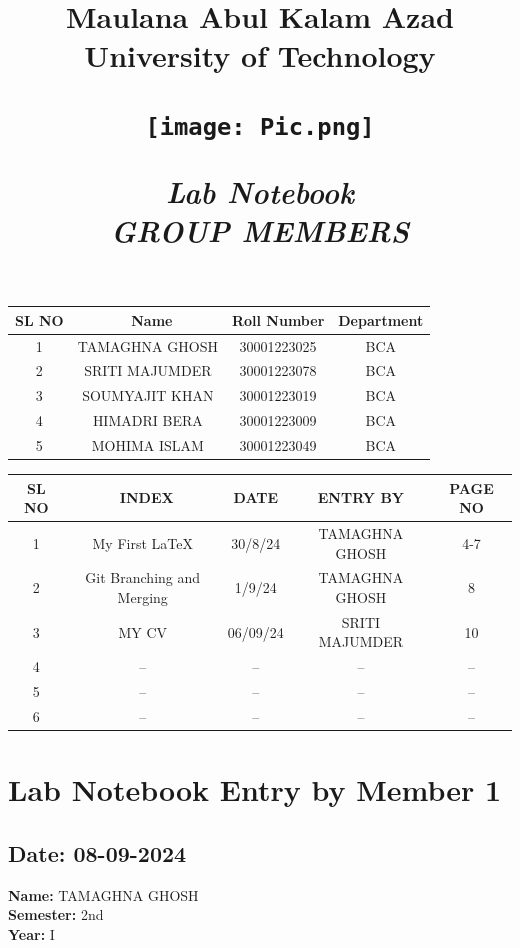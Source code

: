 \documentclass[12pt]{article}
\title{
    \vspace{0.2in}
    \Huge \textbf{Maulana Abul Kalam Azad University of Technology} \\
    \vspace{0.5in} %
    \begin{center}
        \texttt{[image: Pic.png]} %
    \end{center}
    \vspace{0.5in}
    \Huge\textbf{\textit{Lab Notebook}} \\
    \vspace{0.5in}
    \newpage
    \Large \textbf{\textit{GROUP MEMBERS}} \\
    \vspace{0.5in}
}
\date{}
\begin{document}
\maketitle

\begin{center}
    \begin{tabular}{|c| c | c | c |}
    \hline
    \textbf{SL NO}&\
    \textbf{Name} & \textbf{Roll Number} & \textbf{Department} \\
    \hline
     1 & TAMAGHNA GHOSH &30001223025 & BCA  \\
    \hline
     2& SRITI MAJUMDER & 30001223078 & BCA \\
    \hline
     3& SOUMYAJIT KHAN & 30001223019 & BCA   \\
    \hline
     4 & HIMADRI BERA & 30001223009 & BCA \\
    \hline
     5 & MOHIMA ISLAM & 30001223049 & BCA \\
    \hline
    \end{tabular}
\end{center}
\newpage
\begin{center}
    \begin{tabular}{|c|  c | c|c|c| }
    \hline
    \textbf{SL NO}&\
    \textbf{INDEX} & \textbf{DATE}&\textbf{ENTRY BY} &\textbf{PAGE NO} \\
    \hline
     1 & My First \LaTeX & 30/8/24&TAMAGHNA GHOSH & 4-7\\
    \hline
     2&Git Branching and Merging&1/9/24& TAMAGHNA GHOSH &8 \\
    \hline
     3&  MY CV & 06/09/24 & SRITI MAJUMDER & 10\\
    \hline
    4&   -- &-- &--&--\\
    5&--&--&--&--\\
    6&--&--&--&--\\
     \end{tabular}
\end{center}

\newpage

\section{Lab Notebook Entry by Member 1}
\subsection*{Date: 08-09-2024}

\begin{flushright}
\textbf{Name:} TAMAGHNA GHOSH \\
\textbf{Semester:} 2nd \\
\textbf{Year:} I \\
\end{flushright}
\end{document}

